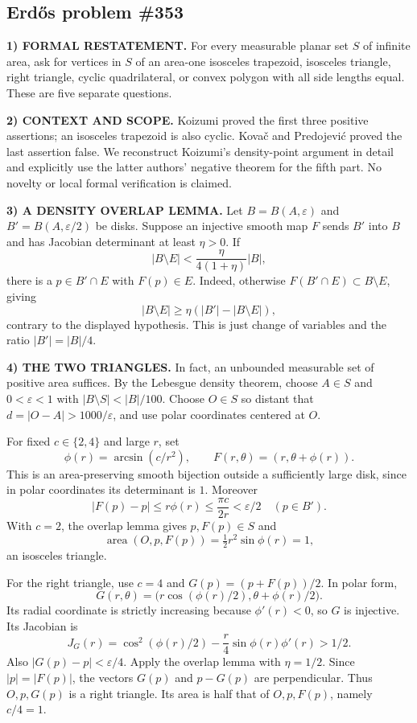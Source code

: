 \subsection*{Erd\H{o}s problem \#353}

\noindent\textbf{1) FORMAL RESTATEMENT.}
For every measurable planar set $S$ of infinite area, ask for vertices in $S$ of an area-one isosceles trapezoid, isosceles triangle, right triangle, cyclic quadrilateral, or convex polygon with all side lengths equal. These are five separate questions.

\noindent\textbf{2) CONTEXT AND SCOPE.}
Koizumi proved the first three positive assertions; an isosceles trapezoid is also cyclic. Kova\v{c} and Predojevi\'{c} proved the last assertion false. We reconstruct Koizumi's density-point argument in detail and explicitly use the latter authors' negative theorem for the fifth part. No novelty or local formal verification is claimed.

\noindent\textbf{3) A DENSITY OVERLAP LEMMA.}
Let $B=B(A,\varepsilon)$ and $B'=B(A,\varepsilon/2)$ be disks. Suppose an injective smooth map $F$ sends $B'$ into $B$ and has Jacobian determinant at least $\eta>0$. If
\[
 |B\setminus E|<\frac{\eta}{4(1+\eta)}|B|,
\]
there is a $p\in B'\cap E$ with $F(p)\in E$. Indeed, otherwise $F(B'\cap E)\subset B\setminus E$, giving
\[
 |B\setminus E|\ge\eta(|B'|-|B\setminus E|),
\]
contrary to the displayed hypothesis. This is just change of variables and the ratio $|B'|=|B|/4$.

\noindent\textbf{4) THE TWO TRIANGLES.}
In fact, an unbounded measurable set of positive area suffices. By the Lebesgue density theorem, choose $A\in S$ and $0<\varepsilon<1$ with $|B\setminus S|<|B|/100$. Choose $O\in S$ so distant that $d=|O-A|>1000/\varepsilon$, and use polar coordinates centered at $O$.

For fixed $c\in\{2,4\}$ and large $r$, set
\[
 \phi(r)=\arcsin(c/r^2),\qquad
 F(r,\theta)=(r,\theta+\phi(r)).
\]
This is an area-preserving smooth bijection outside a sufficiently large disk, since in polar coordinates its determinant is $1$. Moreover
\[
 |F(p)-p|\le r\phi(r)\le\frac{\pi c}{2r}<\varepsilon/2
 \quad(p\in B').
\]
With $c=2$, the overlap lemma gives $p,F(p)\in S$ and
\[
 \operatorname{area}(O,p,F(p))=\tfrac12r^2\sin\phi(r)=1,
\]
an isosceles triangle.

For the right triangle, use $c=4$ and $G(p)=(p+F(p))/2$. In polar form,
\[
 G(r,\theta)=\big(r\cos(\phi(r)/2),\theta+\phi(r)/2\big).
\]
Its radial coordinate is strictly increasing because $\phi'(r)<0$, so $G$ is injective. Its Jacobian is
\[
 J_G(r)=\cos^2(\phi(r)/2)-\frac r4\sin\phi(r)\phi'(r)>1/2.
\]
Also $|G(p)-p|<\varepsilon/4$. Apply the overlap lemma with $\eta=1/2$. Since $|p|=|F(p)|$, the vectors $G(p)$ and $p-G(p)$ are perpendicular. Thus $O,p,G(p)$ is a right triangle. Its area is half that of $O,p,F(p)$, namely $c/4=1$.

